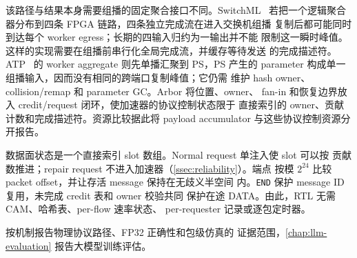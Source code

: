 该路径与结果本身需要组播的固定聚合接口不同。SwitchML~\cite{switchml}
若把一个逻辑聚合器分布到四条 FPGA 链路，四条独立完成流在进入交换机组播
复制后都可能同时到达每个 worker egress；长期的四输入归约为一输出并不能
限制这一瞬时峰值。这样的实现需要在组播前串行化全局完成流，并缓存等待发送
的完成描述符。ATP~\cite{atp} 的 worker aggregate 则先单播汇聚到 PS，PS
产生的 parameter 构成单一组播输入，因而没有相同的跨端口复制峰值；它仍需
维护 hash owner、collision/remap 和 parameter GC。Arbor 将位置、owner、
fan-in 和恢复边界放入 credit/request 闭环，使加速器的协议控制状态限于
直接索引的 owner、贡献计数和完成描述符。资源比较据此将 payload accumulator
与这些协议控制资源分开报告。

数据面状态是一个直接索引 slot 数组。Normal request 单注入使 slot 可以按
贡献数推进；repair request 不进入加速器（\cref{ssec:reliability}）。端点
按模 $2^{24}$ 比较 packet offset，并让存活 message 保持在无歧义半空间
内。\texttt{END} 保护 message ID 复用，未完成 credit 表和 owner 校验共同
保护在途 DATA。由此，RTL 无需 CAM、哈希表、per-flow 速率状态、
per-requester 记录或逐包定时器。

 按机制报告物理协议路径、FP32 正确性和包级仿真的
证据范围，\cref{chap:llm-evaluation} 报告大模型训练评估。
